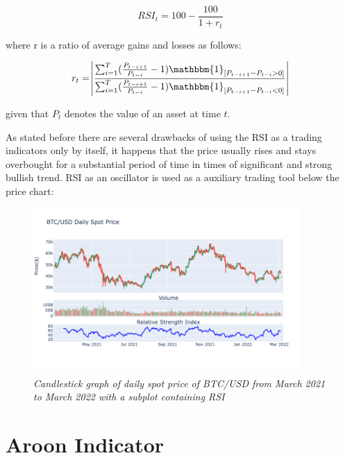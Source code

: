 \begin{equation}
RSI_t = 100- \frac{100}{1+r_t} 
\end{equation}
 
 where r is a ratio of average gains and losses as follows:
 
\begin{equation}
 r_t = \abs{\frac{\sum_{i=1}^{T}(\frac{P_{t-i+1}}{P_{t-i}}-1)\mathbbm{1}_{[P_{t-i+1} - P_{t-i} > 0]}}{\sum_{i=1}^{T}(\frac{P_{t-i+1}}{P_{t-i}}-1) \mathbbm{1}_{[P_{t-i+1} - P_{t-i} < 0]}}}
\end{equation}

given that $P_t$ denotes the value of an asset at time $t$.

As stated before there are several drawbacks of using the RSI as a trading indicators only by itself, it happens that the price usually rises and stays overbought for a substantial period of time in times of significant and strong bullish trend. RSI as an oscillator is used as a auxiliary trading tool below the price chart:

\begin{figure}[h]

\begin{center}
	\includegraphics[width=0.9\textwidth]{RSI.png}
\end{center}

\caption{\textit{ Candlestick graph of daily spot price of BTC/USD from March 2021 to March 2022 with a subplot containing  RSI}}

\end{figure}

\section{Aroon Indicator}

